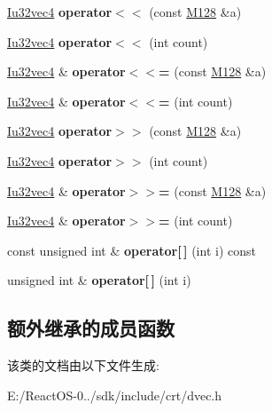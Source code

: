 \begin{DoxyCompactItemize}
\hyperlink{class_iu32vec4}{Iu32vec4} {\bfseries operator$<$$<$} (const \hyperlink{class_m128}{M128} \&a)
\item 
\mbox{\label{class_iu32vec4_a6511231278957a1d073e08a03de42cc1}} 
\hyperlink{class_iu32vec4}{Iu32vec4} {\bfseries operator$<$$<$} (int count)
\item 
\mbox{\label{class_iu32vec4_a2fcedc510d0ea5da852d548c1f5a32b7}} 
\hyperlink{class_iu32vec4}{Iu32vec4} \& {\bfseries operator$<$$<$=} (const \hyperlink{class_m128}{M128} \&a)
\item 
\mbox{\label{class_iu32vec4_ae58633f9f5fb99acdbb360cc4b4d5c42}} 
\hyperlink{class_iu32vec4}{Iu32vec4} \& {\bfseries operator$<$$<$=} (int count)
\item 
\mbox{\label{class_iu32vec4_ae72368fc430e266c6e00cc1fed85a641}} 
\hyperlink{class_iu32vec4}{Iu32vec4} {\bfseries operator$>$$>$} (const \hyperlink{class_m128}{M128} \&a)
\item 
\mbox{\label{class_iu32vec4_a9cad1269d79ad41748cbd5d35e3ac211}} 
\hyperlink{class_iu32vec4}{Iu32vec4} {\bfseries operator$>$$>$} (int count)
\item 
\mbox{\label{class_iu32vec4_af181813e81bed9937922f4e88cd5a6d6}} 
\hyperlink{class_iu32vec4}{Iu32vec4} \& {\bfseries operator$>$$>$=} (const \hyperlink{class_m128}{M128} \&a)
\item 
\mbox{\label{class_iu32vec4_aad6a44906a73ffffb8877f69fee42d36}} 
\hyperlink{class_iu32vec4}{Iu32vec4} \& {\bfseries operator$>$$>$=} (int count)
\item 
\mbox{\label{class_iu32vec4_ae171340c1f672b365b2e976bd2ec6a0a}} 
const unsigned int \& {\bfseries operator\mbox{[}$\,$\mbox{]}} (int i) const
\item 
\mbox{\label{class_iu32vec4_aaa96c56ffaa20884389897f4c1b0cb61}} 
unsigned int \& {\bfseries operator\mbox{[}$\,$\mbox{]}} (int i)
\end{DoxyCompactItemize}
\subsection*{额外继承的成员函数}


该类的文档由以下文件生成\+:\begin{DoxyCompactItemize}
\item 
E\+:/\+React\+O\+S-\/0../sdk/include/crt/dvec.\+h\end{DoxyCompactItemize}
